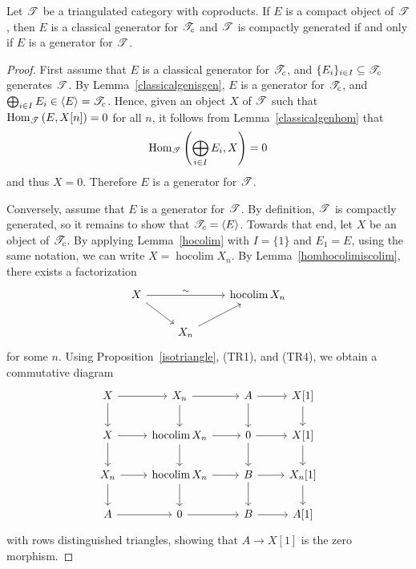 \documentclass[dissertation.tex]{subfiles}
\begin{document}
\begin{prop}
  Let $\mathscr{T}$ be a triangulated category with coproducts.
  If $E$ is a compact object of $\mathscr{T}$, then
  $E$ is a classical generator for $\mathscr{T}_c$ and $\mathscr{T}$ is compactly generated 
  if and only if
  $E$ is a generator for $\mathscr{T}$.
  
  \begin{proof}
    First assume that $E$ is a classical generator for $\mathscr{T}_c$, and $\{E_i\}_{i \in I} \subseteq \mathscr{T}_c$ generates $\mathscr{T}$.
    By Lemma~\ref{classicalgenisgen}, $E$ is a generator for $\mathscr{T}_c$, and $\bigoplus_{i \in I}E_i \in \langle E \rangle = \mathscr{T}_c$.
    Hence, given an object $X$ of $\mathscr{T}$ such that $\operatorname{Hom}_{\mathscr{T}}\left(E,X[n]\right) = 0$ for all $n$, it follows from Lemma~\ref{classicalgenhom} that
    $$\operatorname{Hom}_{\mathscr{T}}\left(\bigoplus_{i \in I}E_i, X\right) = 0$$
    and thus $X = 0$.
    Therefore $E$ is a generator for $\mathscr{T}$.
    
    Conversely, assume that $E$ is a generator for $\mathscr{T}$.
    By definition, $\mathscr{T}$ is compactly generated, so it remains to show that $\mathscr{T}_c = \langle E \rangle$.
    Towards that end, let $X$ be an object of $\mathscr{T}_c$.
    By applying Lemma~\ref{hocolim} with $I = \{1\}$ and $E_1 = E$, using the same notation, we can write $X = \operatorname{hocolim}X_n$.
    By Lemma~\ref{homhocolimiscolim}, there exists a factorization
    $$\begin{tikzcd}
      X \arrow{rd}\arrow{rr}{\sim} & & \operatorname{hocolim} X_n\\
      & X_n\arrow{ur}
    \end{tikzcd}$$
    for some $n$.
    Using Proposition~\ref{isotriangle}, (TR1), and (TR4), we obtain a commutative diagram 
    $$\begin{tikzcd}
      X \arrow{r}\arrow{d} & X_n \arrow{r}\arrow{d} & A \arrow{d}\arrow{r} & X[1]\arrow{d}\\
      X \arrow{d}\arrow{r} & \operatorname{hocolim}X_n \arrow{d}\arrow{r} & 0 \arrow{d}\arrow{r} & X[1]\arrow{d}\\
      X_n \arrow{d}\arrow{r} & \operatorname{hocolim}X_n \arrow{d}\arrow{r} & B \arrow{r}\arrow{d} & X_n[1]\arrow{d}\\
      A \arrow{r} & 0 \arrow{r} & B \arrow{r} & A[1]
    \end{tikzcd}$$
    with rows distinguished triangles, showing that $A \rightarrow X[1]$ is the zero morphism.
    

\end{proof}
\end{prop}
\end{document}
